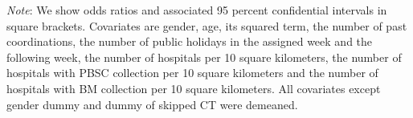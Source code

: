 \documentclass[12pt, a4paper]{article}
\begin{document}
\begin{table}[H]
\begin{threeparttable}
\begin{tabular}[t]{lccccccccc}
\bottomrule
\end{tabular}
\begin{tablenotes}
\item \emph{Note}: We show odds ratios and associated 95 percent confidential intervals in square brackets. Covariates are gender, age, its squared term, the number of past coordinations, the number of public holidays in the assigned week and the following week, the number of hospitals per 10 square kilometers, the number of hospitals with PBSC collection per 10 square kilometers and the number of hospitals with BM collection per 10 square kilometers. All covariates except gender dummy and dummy of skipped CT were demeaned.
\end{tablenotes}
\end{threeparttable}
\end{table}
\end{document}
